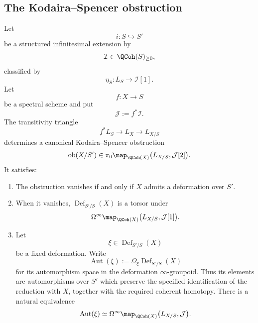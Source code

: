 \subsection{The Kodaira--Spencer obstruction}

\begin{theorem}
\label{thm:global-cotangent-obstruction}
Let
\[
    i
    \colon
    S
    \hookrightarrow
    S'
\]
be a structured infinitesimal extension by
\[
    \mathcal I
    \in
    \QCoh(S)_{\geq0},
\]
classified by
\[
    \eta_S
    \colon
    L_S
    \longrightarrow
    \mathcal I[1].
\]
Let
\[
    f
    \colon
    X
    \longrightarrow
    S
\]
be a spectral scheme and put
\[
    \mathcal J
    :=
    f^*\mathcal I.
\]
The transitivity triangle
\[
    f^*L_S
    \longrightarrow
    L_X
    \longrightarrow
    L_{X/S}
\]
determines a canonical Kodaira--Spencer obstruction
\[
    \operatorname{ob}(X/S')
    \in
    \pi_0
    \map_{\QCoh(X)}
    \bigl(
        L_{X/S},
        \mathcal J[2]
    \bigr).
\]
It satisfies:
\begin{enumerate}[label=(\roman*)]
    \item The obstruction vanishes if and only if \(X\) admits a
    deformation over \(S'\).

    \item When it vanishes, \(\operatorname{Def}_{S'/S}(X)\) is a torsor
    under
    \[
        \Omega^\infty
        \map_{\QCoh(X)}
        \bigl(
            L_{X/S},
            \mathcal J[1]
        \bigr).
    \]

    \item Let
    \[
        \xi
        \in
        \operatorname{Def}_{S'/S}(X)
    \]
    be a fixed deformation. Write
    \[
        \operatorname{Aut}(\xi)
        :=
        \Omega_\xi
        \operatorname{Def}_{S'/S}(X)
    \]
    for its automorphism space in the deformation $\infty$-groupoid.
    Thus its elements are automorphisms over \(S'\) which preserve the
    specified identification of the reduction with \(X\), together with
    the required coherent homotopy. There is a natural equivalence
    \[
        \operatorname{Aut}(\xi)
        \simeq
        \Omega^\infty
        \map_{\QCoh(X)}
        \bigl(
            L_{X/S},
            \mathcal J
        \bigr).
    \]
\end{enumerate}
\end{theorem}

